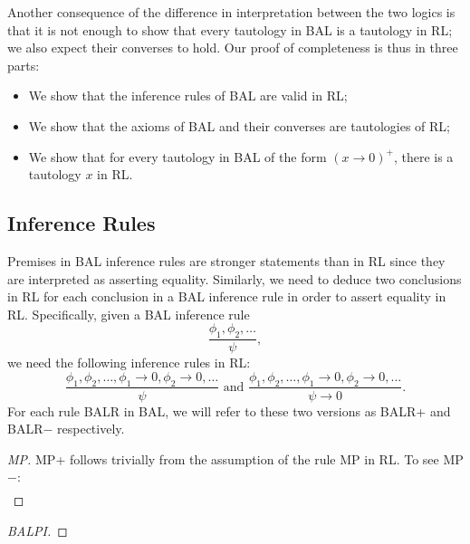 \documentclass[preprint,leqno]{elsarticle}
\begin{document}
Another consequence of the difference in interpretation between the
two logics is that it is not enough to show that every tautology in
BAL is a tautology in RL; we also expect their converses to hold. Our
proof of completeness is thus in three parts:
\begin{itemize}
  \item We show that the inference rules of BAL are valid in RL;
  \item We show that the axioms of BAL and their converses are
    tautologies of RL;
  \item We show that for every tautology in BAL of the form
    $(x\rightarrow 0)^+$, there is a tautology $x$ in RL.
\end{itemize}

\subsection{Inference Rules}

Premises in BAL inference rules are stronger statements than in RL
since they are interpreted as asserting equality. Similarly, we need
to deduce two conclusions in RL for each conclusion in a BAL inference
rule in order to assert equality in RL. Specifically, given a BAL
inference rule
$$\frac{\phi_1,\phi_2,\ldots}{\psi},$$
we need the following inference rules in RL:
$$\frac{\phi_1,\phi_2,\ldots, \phi_1\rightarrow 0, \phi_2\rightarrow
  0, \ldots}{\psi}\text{ and }\frac{\phi_1,\phi_2,\ldots,
  \phi_1\rightarrow 0, \phi_2\rightarrow 0, \ldots}{\psi \rightarrow
  0}.$$
For each rule BALR in BAL, we will refer to these two versions as
BALR+ and BALR$-$ respectively.

\begin{proof}[MP]
MP+ follows trivially from the assumption of the rule MP in RL. To see MP$-$:
\begin{align}

\end{align}
\end{proof}



\begin{proof}[BALPI]

\end{proof}
\end{document}
